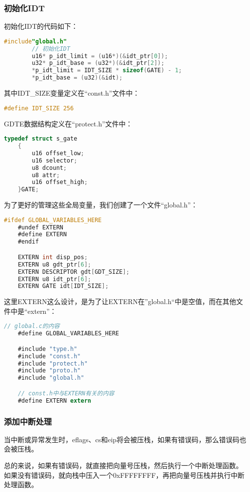 \documentclass[a4paper,left=2.5cm,right=2.5cm,11pt]{article}
\begin{document}
\subsubsection{初始化IDT}
	初始化IDT的代码如下：
	\begin{lstlisting}[language = C]
	#include"global.h"
		// 初始化IDT
		u16* p_idt_limit = (u16*)(&idt_ptr[0]);
		u32* p_idt_base = (u32*)(&idt_ptr[2]);
		*p_idt_limit = IDT_SIZE * sizeof(GATE) - 1;
		*p_idt_base = (u32)(&idt);
	\end{lstlisting}

	其中IDT\_SIZE变量定义在“const.h”文件中：
	\begin{lstlisting}[language = C]
	#define IDT_SIZE 256
	\end{lstlisting}

	GDTE数据结构定义在“protect.h”文件中：
	\begin{lstlisting}[language = C]
	typedef struct s_gate
	{
		u16 offset_low;
		u16 selector;
		u8 dcount;
		u8 attr;
		u16 offset_high;
	}GATE;
	\end{lstlisting}

	为了更好的管理这些全局变量，我们创建了一个文件“global.h”：
	\begin{lstlisting}[language = C]
	#ifdef GLOBAL_VARIABLES_HERE
	#undef EXTERN
	#define EXTERN
	#endif

	EXTERN int disp_pos;
	EXTERN u8 gdt_ptr[6];
	EXTERN DESCRIPTOR gdt[GDT_SIZE];
	EXTERN u8 idt_ptr[6];
	EXTERN GATE idt[IDT_SIZE];
	\end{lstlisting}

	这里EXTERN这么设计，是为了让EXTERN在”global.h“中是空值，而在其他文件中是“extern”：
	\begin{lstlisting}[language = C]
	// global.c的内容
	#define GLOBAL_VARIABLES_HERE

	#include "type.h"
	#include "const.h"
	#include "protect.h"
	#include "proto.h"
	#include "global.h"

	// const.h中与EXTERN有关的内容
	#define EXTERN extern
	\end{lstlisting}

\subsubsection{添加中断处理}
	当中断或异常发生时，eflags、cs和eip将会被压栈，如果有错误码，那么错误码也会被压栈。\par

	总的来说，如果有错误码，就直接把向量号压栈，然后执行一个中断处理函数。
	如果没有错误码，就向栈中压入一个0xFFFFFFFF，再把向量号压栈并执行中断处理函数。\par
\end{document}
